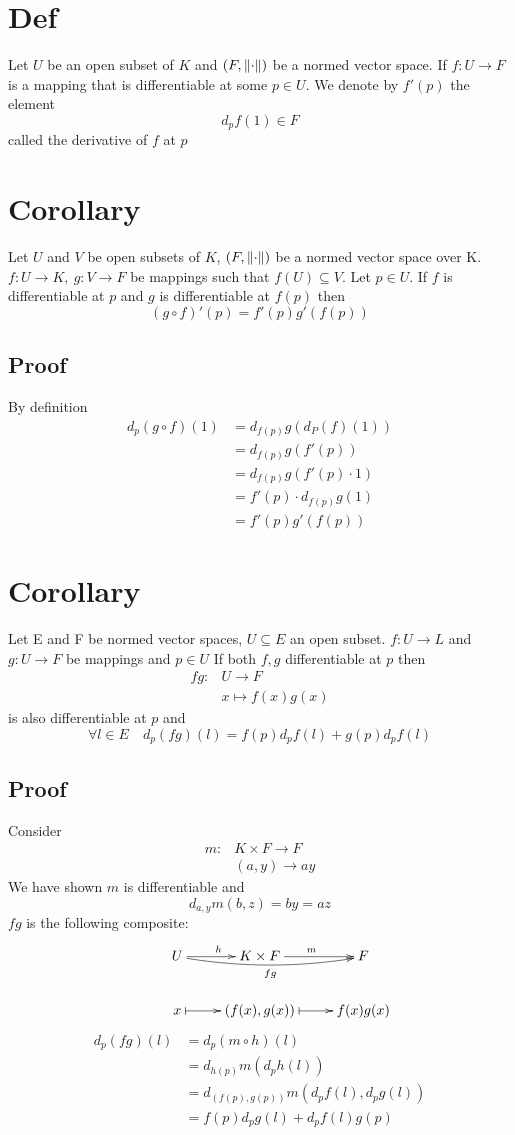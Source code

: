 \documentclass{book}
\begin{document}
\section{Def}
Let $U$ be an open subset of $K$ and $(F,\left\lVert \cdot \right\rVert)$ be a normed vector space. If $f: U\rightarrow F$ is a mapping that is differentiable at some $p\in U$. We denote by $f'(p)$ the element $$d_pf(1)\in F$$ called the derivative of $f$ at $p$
\section{Corollary}
Let $U$ and $V$ be open subsets of $K$, $(F,\left\lVert \cdot \right\rVert)$ be a normed vector space over K. $f:U\rightarrow K,\ g:V\rightarrow F$ be mappings such that $f(U)\subseteq V$. Let $p\in U$. If $f$ is differentiable at $p$ and $g$ is differentiable at $f(p)$ then $$(g\circ f)'(p)=f'(p)g'(f(p))$$
\subsection*{Proof}
By definition
$$\begin{aligned}
    d_p(g\circ f)(1) &= d_{f(p)}g(d_P(f)(1))\\
    &= d_{f(p)}g(f'(p))\\
    &= d_{f(p)}g(f'(p)\cdot 1)\\
    &= f'(p)\cdot d_{f(p)}g(1)\\
    &= f'(p)g'(f(p))
\end{aligned}$$
\section{Corollary}
Let E and F be normed vector spaces, $U\subseteq E$ an open subset. $f:U\rightarrow L$ and $g:U\rightarrow F$ be mappings and $p\in U$ If both $f,g$ differentiable at $p$ then $$\begin{aligned}
    fg: &U\rightarrow F\\ &x\mapsto f(x)g(x)
\end{aligned}$$
is also differentiable at $p$ and $$\forall l\in E\quad d_p(fg)(l)=f(p)d_pf(l)+g(p)d_pf(l)$$
\subsection*{Proof}
Consider $$\begin{aligned}
    m: &K\times F\rightarrow F\\ &(a,y)\rightarrow ay
\end{aligned}$$
We have shown $m$ is differentiable and $$d_{a,y}m(b,z)=by=az$$
$fg$ is the following composite:
$$
\xymatrix{
    & U \ar@/_/[rr]_{fg}\ar[r]^h &K\times F\ar[r]^m &F \\
    & x \ar@{|->}[r] &(f(x),g(x))\ar@{|->}[r] &f(x)g(x)
}$$
$$\begin{aligned}
    d_p(fg)(l) &= d_p(m\circ h)(l)\\
    &= d_{h(p)}m(d_ph(l))\\
    &= d_{(f(p),g(p))}m(d_pf(l),d_pg(l))\\
    &= f(p)d_pg(l)+d_pf(l)g(p)
\end{aligned}$$
\end{document}
